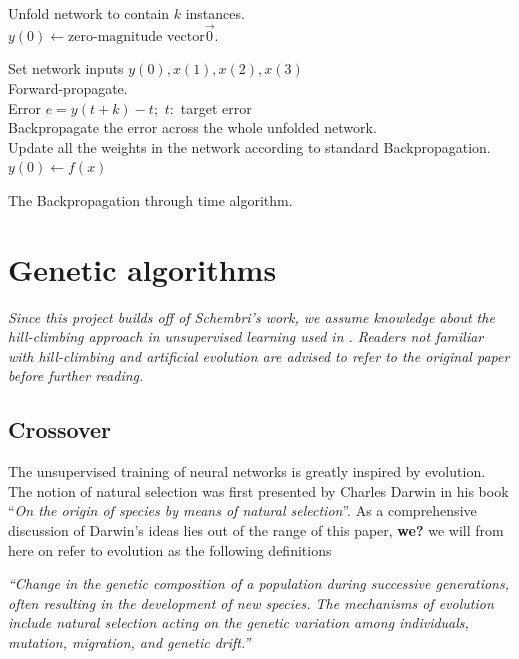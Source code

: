 \documentclass[10pt,a4paper,DIV=11]{scrreprt}
\begin{document}
\begin{algorithm}
\LinesNumbered
\DontPrintSemicolon
\BlankLine
{}
\BlankLine
\Begin
{
    Unfold network to contain $k$ instances.\\
    $y(0) \leftarrow \text{zero-magnitude vector} \overrightarrow{0}$.
    
    {
        Set network inputs $y(0), x(1), x(2), x(3)$\\
        Forward-propagate.\\ 
        Error $e = y(t+k) - t;$ $t:$ target error\\
        Backpropagate the error across the whole unfolded network.\\
        Update all the weights in the network according to standard Backpropagation.\\
        $y(0) \leftarrow f(x)$

    
    }
}
\caption{The Backpropagation through time algorithm.}
\label{alg:GD}
\end{algorithm}

\section{Genetic algorithms}
\textit{Since this project builds off of Schembri's work, we assume knowledge about the hill-climbing approach in unsupervised learning used in \cite{DANIEL}. Readers not
familiar with hill-climbing and artificial evolution are advised to refer to the original paper before further reading.} 

\subsection{Crossover}
The unsupervised training of neural networks is greatly inspired by evolution. The notion of natural selection was first presented by Charles Darwin in his book “\textit{On the origin of species by means of natural selection}”\cite{DARWIN}. 
As a comprehensive discussion of Darwin's ideas lies out of the range of this paper, \textbf{we?} we will from here on refer to evolution as the following definitions%

\begin{center}
\textit{“Change in the genetic composition of a population during successive generations, often resulting in the development of new species. The mechanisms of evolution include natural selection acting on the genetic variation among individuals, mutation, migration, and genetic drift.”}\\
\end{center}
\end{document}
